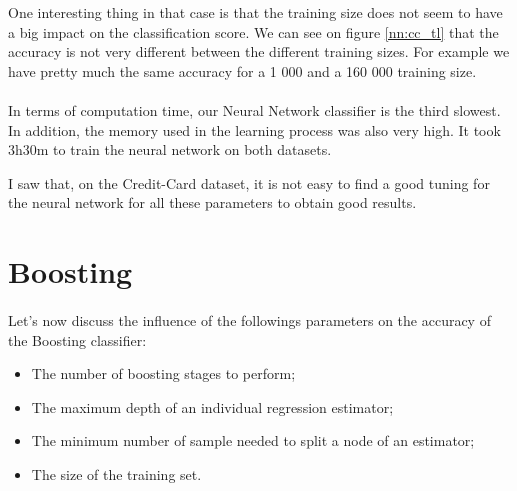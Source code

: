 \documentclass[10pt]{article}
\begin{document}
			One interesting thing in that case is that the training size does not seem to have a big impact on the classification score. We can see on figure \ref{nn:cc_tl} that the accuracy is not very different between the different training sizes. For example we have pretty much the same accuracy for a 1 000 and a 160 000 training size.
		\paragraph*{}
			In terms of computation time, our Neural Network classifier is the third slowest. In addition, the memory used in the learning process was also very high. It took 3h30m to train the neural network on both datasets.

			I saw that, on the Credit-Card dataset, it is not easy to find a good tuning for the neural network for all these parameters to obtain good results.
	\section{Boosting}
		\paragraph*{}
			Let's now discuss the influence of the followings parameters on the accuracy of the Boosting classifier:
			\begin{itemize}
				\item The number of boosting stages to perform;
				\item The maximum depth of an individual regression estimator;
				\item The minimum number of sample needed to split a node of an estimator;
				\item The size of the training set.
			\end{itemize}
\end{document}
